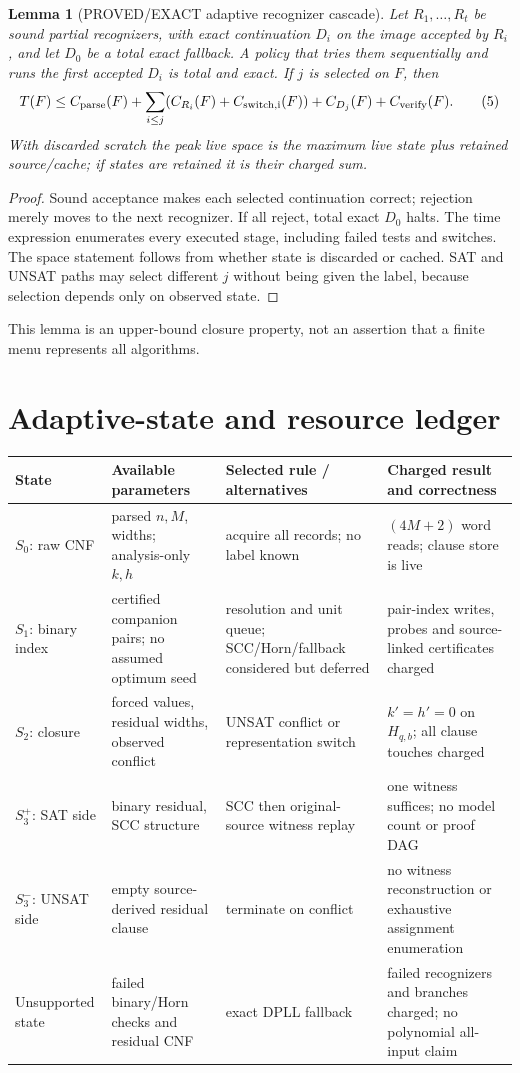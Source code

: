 \documentclass[11pt]{article}
\newtheorem{lemma}{Lemma}
\begin{document}
\begin{lemma}[PROVED/EXACT adaptive recognizer cascade]
Let $R_1,\ldots,R_t$ be sound partial recognizers, with exact continuation
$D_i$ on the image accepted by $R_i$, and let $D_0$ be a total exact fallback.
A policy that tries them sequentially and runs the first accepted $D_i$ is
total and exact.  If $j$ is selected on $F$, then
\[
T(F)\le C_{\rm parse}(F)+\sum_{i\le j}
(C_{R_i}(F)+C_{\rm switch,i}(F))+C_{D_j}(F)+C_{\rm verify}(F).
\tag{5}
\]
With discarded scratch the peak live space is the maximum live state plus
retained source/cache; if states are retained it is their charged sum.
\end{lemma}
\begin{proof}
Sound acceptance makes each selected continuation correct; rejection merely
moves to the next recognizer.  If all reject, total exact $D_0$ halts.  The
time expression enumerates every executed stage, including failed tests and
switches.  The space statement follows from whether state is discarded or
cached.  SAT and UNSAT paths may select different $j$ without being given the
label, because selection depends only on observed state.
\end{proof}

This lemma is an upper-bound closure property, not an assertion that a finite
menu represents all algorithms.

\section{Adaptive-state and resource ledger}
\begin{center}\footnotesize
\begin{tabular}{p{.15\linewidth}p{.22\linewidth}p{.22\linewidth}p{.29\linewidth}}
\toprule
State & Available parameters & Selected rule / alternatives & Charged result and correctness\\\midrule
$S_0$: raw CNF & parsed $n,M$, widths; analysis-only $k,h$ & acquire all records; no label known & $(4M+2)$ word reads; clause store is live\\
$S_1$: binary index & certified companion pairs; no assumed optimum seed & resolution and unit queue; SCC/Horn/fallback considered but deferred & pair-index writes, probes and source-linked certificates charged\\
$S_2$: closure & forced values, residual widths, observed conflict & UNSAT conflict or representation switch & $k'=h'=0$ on $H_{q,b}$; all clause touches charged\\
$S_3^+$: SAT side & binary residual, SCC structure & SCC then original-source witness replay & one witness suffices; no model count or proof DAG\\
$S_3^-$: UNSAT side & empty source-derived residual clause & terminate on conflict & no witness reconstruction or exhaustive assignment enumeration\\
Unsupported state & failed binary/Horn checks and residual CNF & exact DPLL fallback & failed recognizers and branches charged; no polynomial all-input claim\\
\bottomrule
\end{tabular}
\end{center}
\end{document}
